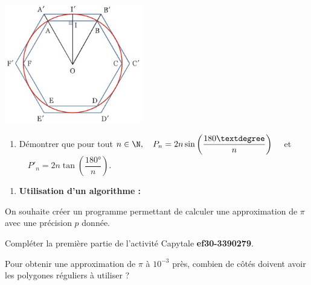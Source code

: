 \documentclass[a4paper,11pt,exos]{nsi} %
\begin{document}
{\includegraphics[width=6cm]{p6.jpg}}
\begin{enumerate}[label=\textbf{3.}]
    \item  Démontrer que pour tout $n\in\N, \quad P_n=2n\sin\left(\dfrac{180°}{n}\right)\quad$ et $\quad P'_n=2n\tan\left(\dfrac{180°}{n}\right)$.
\end{enumerate}
\begin{enumerate}[label=\textbf{4.}]
    \item  \textbf{Utilisation d'un algorithme :}
\end{enumerate}
On souhaite créer un programme permettant de calculer une approximation de $\pi$ avec une précision $p$ donnée.
\begin{enumalph}
    \item Compléter la première partie de l'activité Capytale \textbf{ef30-3390279}. 
    \item Pour obtenir une approximation de $\pi$ à $10^{-3}$ près, combien de côtés doivent avoir les polygones réguliers à utiliser ?
\end{enumalph}
\end{document}
